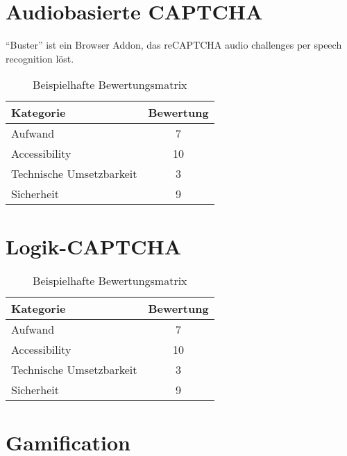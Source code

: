 \section{Audiobasierte CAPTCHA}

“Buster” ist ein Browser Addon, das reCAPTCHA audio challenges per speech recognition löst.

\begin{table}[h!]
    \caption{Beispielhafte Bewertungsmatrix}
    \begin{center}
        \begin{tabular}{l|c}
            Kategorie                       & Bewertung \\\hline
            Aufwand                         & 7         \\
            Accessibility                   & 10        \\
            Technische Umsetzbarkeit        & 3         \\
            Sicherheit                      & 9         
        \end{tabular}
    \end{center}
\end{table}

\section{Logik-CAPTCHA}

\begin{table}[h!]
    \caption{Beispielhafte Bewertungsmatrix}
    \begin{center}
        \begin{tabular}{l|c}
            Kategorie                       & Bewertung \\\hline
            Aufwand                         & 7         \\
            Accessibility                   & 10        \\
            Technische Umsetzbarkeit        & 3         \\
            Sicherheit                      & 9         
        \end{tabular}
    \end{center}
\end{table}

\section{Gamification}

